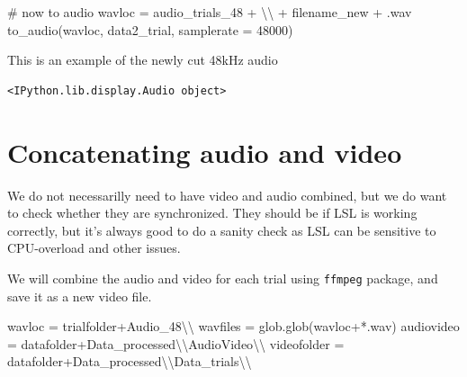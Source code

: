 \documentclass[
  letterpaper,
  DIV=11,
  numbers=noendperiod]{scrreprt}
\newenvironment{Shaded}{\begin{snugshade}}{\end{snugshade}}
\newcommand{\CharTok}[1]{\textcolor[rgb]{0.13,0.47,0.30}{#1}}
\newcommand{\CommentTok}[1]{\textcolor[rgb]{0.37,0.37,0.37}{#1}}
\newcommand{\DecValTok}[1]{\textcolor[rgb]{0.68,0.00,0.00}{#1}}
\newcommand{\NormalTok}[1]{\textcolor[rgb]{0.00,0.23,0.31}{#1}}
\newcommand{\OperatorTok}[1]{\textcolor[rgb]{0.37,0.37,0.37}{#1}}
\newcommand{\StringTok}[1]{\textcolor[rgb]{0.13,0.47,0.30}{#1}}
\begin{document}
\begin{Shaded}
\begin{Highlighting}[]
        \CommentTok{\# now to audio}
\NormalTok{        wavloc }\OperatorTok{=}\NormalTok{ audio\_trials\_48 }\OperatorTok{+} \StringTok{\textquotesingle{}}\CharTok{\textbackslash{}\textbackslash{}}\StringTok{\textquotesingle{}} \OperatorTok{+}\NormalTok{ filename\_new }\OperatorTok{+} \StringTok{\textquotesingle{}.wav\textquotesingle{}}
\NormalTok{        to\_audio(wavloc, data2\_trial, samplerate }\OperatorTok{=} \DecValTok{48000}\NormalTok{)}
\end{Highlighting}
\end{Shaded}

This is an example of the newly cut 48kHz audio

\begin{verbatim}
<IPython.lib.display.Audio object>
\end{verbatim}


\chapter{Concatenating audio and
video}\label{concatenating-audio-and-video}

We do not necessarilly need to have video and audio combined, but we do
want to check whether they are synchronized. They should be if LSL is
working correctly, but it's always good to do a sanity check as LSL can
be sensitive to CPU-overload and other issues.

We will combine the audio and video for each trial using \texttt{ffmpeg}
package, and save it as a new video file.

\begin{Shaded}
\begin{Highlighting}[]
\NormalTok{wavloc }\OperatorTok{=}\NormalTok{ trialfolder}\OperatorTok{+}\StringTok{\textquotesingle{}Audio\_48}\CharTok{\textbackslash{}\textbackslash{}}\StringTok{\textquotesingle{}}
\NormalTok{wavfiles }\OperatorTok{=}\NormalTok{ glob.glob(wavloc}\OperatorTok{+}\StringTok{\textquotesingle{}*.wav\textquotesingle{}}\NormalTok{)}
\NormalTok{audiovideo }\OperatorTok{=}\NormalTok{ datafolder}\OperatorTok{+}\StringTok{\textquotesingle{}Data\_processed}\CharTok{\textbackslash{}\textbackslash{}}\StringTok{AudioVideo}\CharTok{\textbackslash{}\textbackslash{}}\StringTok{\textquotesingle{}}
\NormalTok{videofolder }\OperatorTok{=}\NormalTok{ datafolder}\OperatorTok{+}\StringTok{\textquotesingle{}Data\_processed}\CharTok{\textbackslash{}\textbackslash{}}\StringTok{Data\_trials}\CharTok{\textbackslash{}\textbackslash{}}\StringTok{\textquotesingle{}}
\end{Highlighting}
\end{Shaded}
\end{document}
